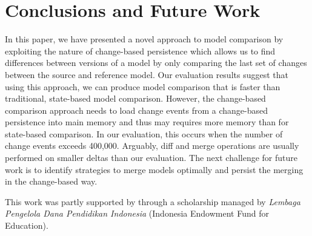 \documentclass{jot}
\begin{document}
\section{Conclusions and Future Work}
\label{sec:conclusion_and_future_work}
In this paper, we have presented a novel approach to model comparison by exploiting the nature of change-based persistence which allows us to find differences between versions of a model by only comparing the last set of changes between the source and reference model.
Our evaluation results suggest that using this approach, we can produce model comparison that is faster than traditional, state-based model comparison.
However, the change-based comparison approach needs to load change events from a change-based persistence into main memory and thus may requires more memory than for state-based comparison. In our evaluation, this occurs when the number of change events exceeds 400,000.
Arguably, diff and merge operations are usually performed on smaller deltas than our evaluation.
The next challenge for future work is to identify strategies to merge models optimally and persist the merging in the change-based way. 

\backmatter






\begin{acknowledgments}
This work was partly supported by through a scholarship managed by \emph{Lembaga Pengelola Dana Pendidikan Indonesia} (Indonesia Endowment Fund for Education).
\end{acknowledgments}
\end{document}
